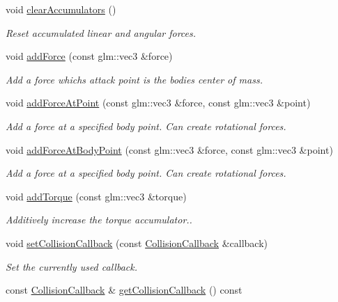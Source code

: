 \begin{DoxyCompactItemize}
void \mbox{\hyperlink{classr3_1_1_rigid_body_a86bfec9a651351b27c0f53f5db56c7c4}{clear\+Accumulators}} ()
\begin{DoxyCompactList}\small\item\em Reset accumulated linear and angular forces. \end{DoxyCompactList}\item 
void \mbox{\hyperlink{classr3_1_1_rigid_body_a3ec9e7463d7c9a6607b35a334049a1e3}{add\+Force}} (const glm\+::vec3 \&force)
\begin{DoxyCompactList}\small\item\em Add a force which\textquotesingle{}s attack point is the bodies center of mass. \end{DoxyCompactList}\item 
void \mbox{\hyperlink{classr3_1_1_rigid_body_a9e8fc5409e15ae0184baf3238b97dec7}{add\+Force\+At\+Point}} (const glm\+::vec3 \&force, const glm\+::vec3 \&point)
\begin{DoxyCompactList}\small\item\em Add a force at a specified body point. Can create rotational forces. \end{DoxyCompactList}\item 
void \mbox{\hyperlink{classr3_1_1_rigid_body_abba1067c4db2d246e3f82b6c1bd35c87}{add\+Force\+At\+Body\+Point}} (const glm\+::vec3 \&force, const glm\+::vec3 \&point)
\begin{DoxyCompactList}\small\item\em Add a force at a specified body point. Can create rotational forces. \end{DoxyCompactList}\item 
void \mbox{\hyperlink{classr3_1_1_rigid_body_a276ac614e4eab3df963d64401112bd36}{add\+Torque}} (const glm\+::vec3 \&torque)
\begin{DoxyCompactList}\small\item\em Additively increase the torque accumulator.. \end{DoxyCompactList}\item 
void \mbox{\hyperlink{classr3_1_1_rigid_body_a7936cec92e28c40ba886b66b274e1858}{set\+Collision\+Callback}} (const \mbox{\hyperlink{classr3_1_1_collision_callback}{Collision\+Callback}} \&callback)
\begin{DoxyCompactList}\small\item\em Set the currently used callback. \end{DoxyCompactList}\item 
const \mbox{\hyperlink{classr3_1_1_collision_callback}{Collision\+Callback}} \& \mbox{\hyperlink{classr3_1_1_rigid_body_ac138908f5f7aa4763683d9bdd4cc9fd5}{get\+Collision\+Callback}} () const

\end{DoxyCompactItemize}
